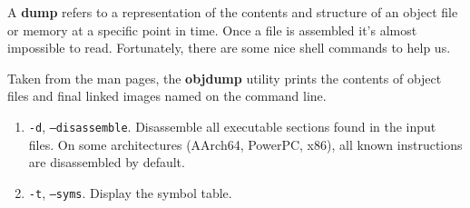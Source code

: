   A \textbf{dump} refers to a representation of the contents and structure of an object file or memory at a specific point in time. Once a file is assembled it's almost impossible to read. Fortunately, there are some nice shell commands to help us. 

  \begin{definition}
    Taken from the man pages, the \textbf{objdump} utility prints the contents of object files and final linked images named on the command line. 
    \begin{enumerate}
      \item \texttt{-d}, \texttt{--disassemble}. Disassemble all executable sections found in the input files. On some architectures (AArch64, PowerPC, x86), all known instructions are disassembled by default. 
      \item \texttt{-t}, \texttt{--syms}. Display the symbol table. 
    \end{enumerate}
  \end{definition}

